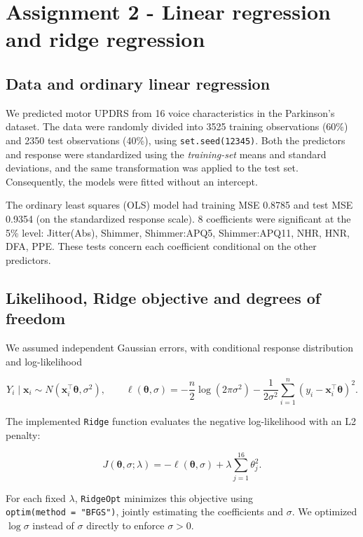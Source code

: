 \documentclass[
  english,
  11pt,
]{article}
\author{}
\date{}
\begin{document}
\section{Assignment 2 - Linear regression and ridge
regression}\label{assignment-2---linear-regression-and-ridge-regression}

\subsection{Data and ordinary linear
regression}\label{data-and-ordinary-linear-regression}

We predicted motor UPDRS from 16 voice characteristics in the
Parkinson's dataset. The data were randomly divided into 3525 training
observations (60\%) and 2350 test observations (40\%), using
\texttt{set.seed(12345)}. Both the predictors and response were
standardized using the \emph{training-set} means and standard
deviations, and the same transformation was applied to the test set.
Consequently, the models were fitted without an intercept.

The ordinary least squares (OLS) model had training MSE 0.8785 and test
MSE 0.9354 (on the standardized response scale). 8 coefficients were
significant at the 5\% level: Jitter(Abs), Shimmer, Shimmer:APQ5,
Shimmer:APQ11, NHR, HNR, DFA, PPE. These tests concern each coefficient
conditional on the other predictors.

\subsection{Likelihood, Ridge objective and degrees of
freedom}\label{likelihood-ridge-objective-and-degrees-of-freedom}

We assumed independent Gaussian errors, with conditional response
distribution and log-likelihood

\[
Y_i\mid \mathbf{x}_i \sim N(\mathbf{x}_i^\top\boldsymbol\theta,\sigma^2),
\qquad
\ell(\boldsymbol\theta,\sigma)
=-\frac{n}{2}\log(2\pi\sigma^2)
-\frac{1}{2\sigma^2}\sum_{i=1}^{n}
(y_i-\mathbf{x}_i^\top\boldsymbol\theta)^2.
\]

The implemented \texttt{Ridge} function evaluates the negative
log-likelihood with an L2 penalty:

\[
J(\boldsymbol\theta,\sigma;\lambda)
=-\ell(\boldsymbol\theta,\sigma)
+\lambda\sum_{j=1}^{16}\theta_j^2.
\]

For each fixed \(\lambda\), \texttt{RidgeOpt} minimizes this objective
using \texttt{optim(method\ =\ "BFGS")}, jointly estimating the
coefficients and \(\sigma\). We optimized \(\log\sigma\) instead of
\(\sigma\) directly to enforce \(\sigma>0\).
\end{document}
